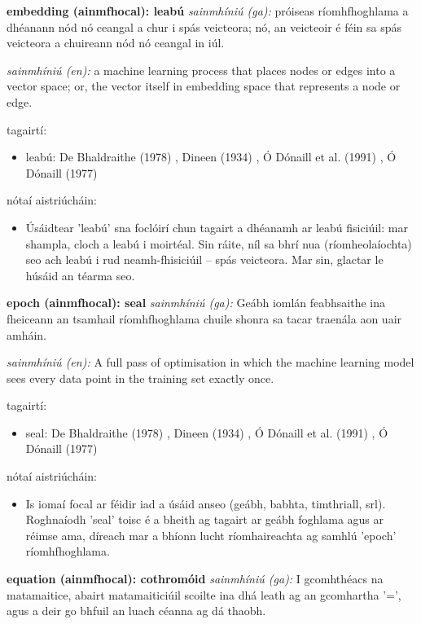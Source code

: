 \documentclass{article}
\begin{document}
\textbf{embedding (ainmfhocal): leabú}
\textit{sainmhíniú (ga):} próiseas ríomhfhoghlama a dhéanann nód nó ceangal a chur i spás veicteora; nó, an veicteoir é féin sa spás veicteora a chuireann nód nó ceangal in iúl.

\textit{sainmhíniú (en):} a machine learning process that places nodes or edges into a vector space; or, the vector itself in embedding space that represents a node or edge.

tagairtí:
\begin{itemize}
	\item leabú: De Bhaldraithe (1978) \cite{de-bhaldraithe}, Dineen (1934) \cite{dineen}, Ó Dónaill et al. (1991) \cite{focloir-beag}, Ó Dónaill (1977) \cite{odonaill}
\end{itemize}

nótaí aistriúcháin:
\begin{itemize}
	\item Úsáidtear 'leabú' sna foclóirí chun tagairt a dhéanamh ar leabú fisiciúil: mar shampla, cloch a leabú i moirtéal. Sin ráite, níl sa bhrí nua (ríomheolaíochta) seo ach leabú i rud neamh-fhisiciúil -- spás veicteora. Mar sin, glactar le húsáid an téarma seo.
\end{itemize}


\textbf{epoch (ainmfhocal): seal}
\textit{sainmhíniú (ga):}  Geábh iomlán feabhsaithe ina fheiceann an tsamhail ríomhfhoghlama chuile shonra sa tacar traenála aon uair amháin.

\textit{sainmhíniú (en):} A full pass of optimisation in which the machine learning model sees every data point in the training set exactly once.

tagairtí:
\begin{itemize}
	\item seal: De Bhaldraithe (1978) \cite{de-bhaldraithe}, Dineen (1934) \cite{dineen}, Ó Dónaill et al. (1991) \cite{focloir-beag}, Ó Dónaill (1977) \cite{odonaill}
\end{itemize}

nótaí aistriúcháin:
\begin{itemize}
	\item Is iomaí focal ar féidir iad a úsáid anseo (geábh, babhta, timthriall, srl). Roghnaíodh 'seal' toisc é a bheith ag tagairt ar geábh foghlama agus ar réimse ama, díreach mar a bhíonn lucht ríomhaireachta ag samhlú 'epoch' ríomhfhoghlama.
\end{itemize}


\textbf{equation (ainmfhocal): cothromóid}
\textit{sainmhíniú (ga):} I gcomhthéacs na matamaitice, abairt matamaiticiúil scoilte ina dhá leath ag an gcomhartha '=', agus a deir go bhfuil an luach céanna ag dá thaobh.
\end{document}
